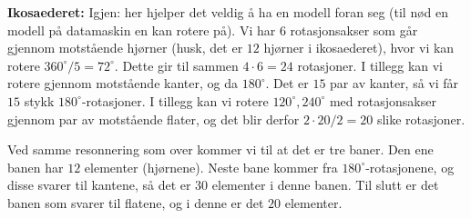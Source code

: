 \documentclass[11pt, norsk]{article}
\begin{document}
\begin{losn}
\textbf{Ikosaederet: } Igjen: her hjelper det veldig å ha en modell foran seg (til nød en modell på datamaskin en kan rotere på). Vi har $6$ rotasjonsakser som går gjennom motstående hjørner (husk, det er $12$ hjørner i ikosaederet), hvor vi kan rotere $360^\circ/5 = 72^\circ$. Dette gir til sammen $4 \cdot 6=24$ rotasjoner. I tillegg kan vi rotere gjennom motstående kanter, og da $180^\circ$. Det er $15$ par av kanter, så vi får $15$ stykk $180^\circ$-rotasjoner. I tillegg kan vi rotere $120^\circ,240^\circ$ med rotasjonsakser gjennom par av motstående flater, og det blir derfor $2 \cdot 20/2=20$ slike rotasjoner.

Ved samme resonnering som over kommer vi til at det er tre baner. Den ene banen har $12$ elementer (hjørnene). Neste bane kommer fra $180^\circ$-rotasjonene, og disse svarer til kantene, så det er $30$ elementer i denne banen. Til slutt er det banen som svarer til flatene, og i denne er det $20$ elementer.
\end{losn}
\end{document}

